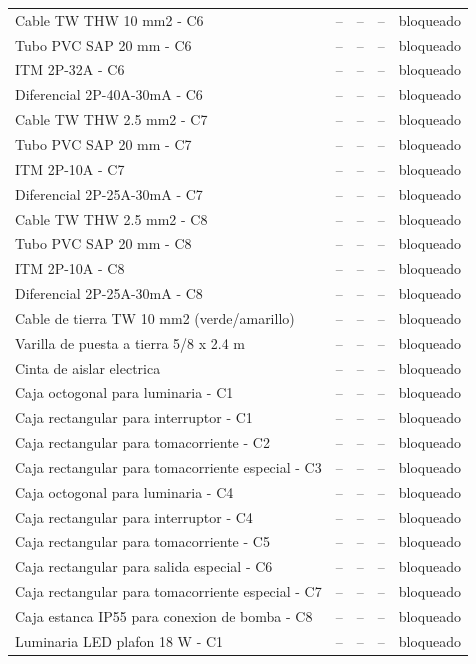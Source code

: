 \documentclass[11pt,a4paper]{article}
\begin{document}
\begin{longtable}{p{} p{} r r p{}}
Cable TW THW 10 mm2 - C6 & -- & -- & -- & bloqueado \\
Tubo PVC SAP 20 mm - C6 & -- & -- & -- & bloqueado \\
ITM 2P-32A - C6 & -- & -- & -- & bloqueado \\
Diferencial 2P-40A-30mA - C6 & -- & -- & -- & bloqueado \\
Cable TW THW 2.5 mm2 - C7 & -- & -- & -- & bloqueado \\
Tubo PVC SAP 20 mm - C7 & -- & -- & -- & bloqueado \\
ITM 2P-10A - C7 & -- & -- & -- & bloqueado \\
Diferencial 2P-25A-30mA - C7 & -- & -- & -- & bloqueado \\
Cable TW THW 2.5 mm2 - C8 & -- & -- & -- & bloqueado \\
Tubo PVC SAP 20 mm - C8 & -- & -- & -- & bloqueado \\
ITM 2P-10A - C8 & -- & -- & -- & bloqueado \\
Diferencial 2P-25A-30mA - C8 & -- & -- & -- & bloqueado \\
Cable de tierra TW 10 mm2 (verde/amarillo) & -- & -- & -- & bloqueado \\
Varilla de puesta a tierra 5/8 x 2.4 m & -- & -- & -- & bloqueado \\
Cinta de aislar electrica & -- & -- & -- & bloqueado \\
Caja octogonal para luminaria - C1 & -- & -- & -- & bloqueado \\
Caja rectangular para interruptor - C1 & -- & -- & -- & bloqueado \\
Caja rectangular para tomacorriente - C2 & -- & -- & -- & bloqueado \\
Caja rectangular para tomacorriente especial - C3 & -- & -- & -- & bloqueado \\
Caja octogonal para luminaria - C4 & -- & -- & -- & bloqueado \\
Caja rectangular para interruptor - C4 & -- & -- & -- & bloqueado \\
Caja rectangular para tomacorriente - C5 & -- & -- & -- & bloqueado \\
Caja rectangular para salida especial - C6 & -- & -- & -- & bloqueado \\
Caja rectangular para tomacorriente especial - C7 & -- & -- & -- & bloqueado \\
Caja estanca IP55 para conexion de bomba - C8 & -- & -- & -- & bloqueado \\
Luminaria LED plafon 18 W - C1 & -- & -- & -- & bloqueado \\

\end{longtable}
\end{document}
